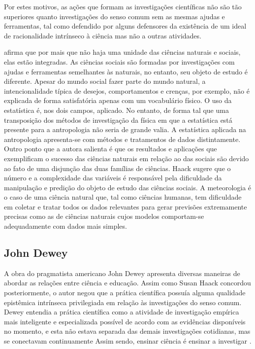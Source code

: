 \documentclass[12pt]{report}
\begin{document}
		Por estes motivos, as ações que formam as investigações científicas não são tão superiores quanto investigações do senso comum sem as mesmas ajudas e ferramentas, tal como defendido por alguns defensores da existência de um ideal de racionalidade intrínseco à ciência mas não a outras atividades.

		\textcite{haack-defending-science} afirma que por mais que não haja uma unidade das ciências naturais e sociais, elas estão integradas.
		As ciências sociais são formadas por investigações com ajudas e ferramentas semelhantes às naturais, no entanto, seu objeto de estudo é diferente.
		Apesar do mundo social fazer parte do mundo natural, a intencionalidade típica de desejos, comportamentos e crenças, por exemplo, não é explicada de forma satisfatória apenas com um vocabulário físico.
		O uso da estatística é, nos dois campos, aplicado.
		No entanto, de forma tal que uma transposição dos métodos de investigação da física em que a estatística está presente para a antropologia não seria de grande valia.
		A estatística aplicada na antropologia apresenta-se com métodos e tratamentos de dados distintamente.
		Outro ponto que a autora salienta é que os resultados e aplicações que exemplificam o sucesso das ciências naturais em relação ao das sociais são devido ao fato de uma disjunção das duas famílias de ciências.
		Haack sugere que o número e a complexidade das variáveis é responsável pela dificuldade da manipulação e predição do objeto de estudo das ciências sociais.
		A meteorologia é o caso de uma ciência natural que, tal como ciências humanas, tem dificuldade em coletar e tratar todos os dados relevantes para gerar previsões extremamente precisas como as de ciências naturais cujos modelos comportam-se adequadamente com dados mais simples.
	
	\subsection{John Dewey}
	
		A obra do pragmatista americano John Dewey apresenta diversas maneiras de abordar as relações entre ciência e educação.
		Assim como Susan Haack concordou posteriormente, o autor negou que a prática científica possuía alguma qualidade epistêmica intrínseca privilegiada em relação às investigações do senso comum.
		Dewey entendia a prática científica como a atividade de investigação empírica mais inteligente e especializada possível de acordo com as evidências disponíveis no momento, e esta não estava separada das demais investigações cotidianas, mas se conectavam continuamente
		Assim sendo, ensinar ciência é ensinar a investigar \cite{dewey-ee, dewey_logic}.
		
\end{document}
